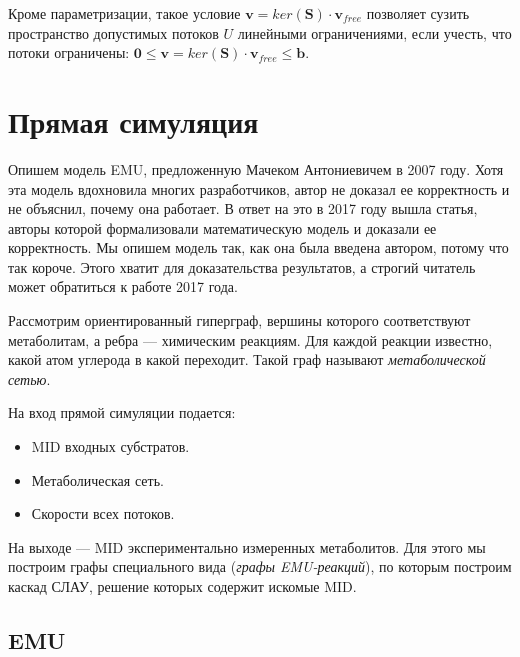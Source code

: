 \documentclass[14pt, a4paper]{extreport}
\begin{document}
Кроме параметризации, такое условие $\mathbf{v} = ker(\mathbf{S}) \cdot \mathbf{v}_{free}$ позволяет сузить пространство допустимых потоков $U$ линейными ограничениями, если учесть, что потоки ограничены: $\mathbf{0} \le \mathbf{v} = ker(\mathbf{S}) \cdot \mathbf{v}_{free} \le \mathbf{b}$.



\clearpage
\section{Прямая симуляция}
Опишем модель EMU, предложенную Мачеком Антониевичем в 2007 году\cite{EMU_2007}. Хотя эта модель вдохновила многих разработчиков, автор не доказал ее корректность и не объяснил, почему она работает. В ответ на это в 2017 году вышла статья\cite{formalizm_2017}, авторы которой формализовали математическую модель и доказали ее корректность. Мы опишем модель так, как она была введена автором, потому что так короче. Этого хватит для доказательства результатов, а строгий читатель может обратиться к работе 2017 года. 

Рассмотрим ориентированный гиперграф, вершины которого соответствуют метаболитам, а ребра --- химическим реакциям. Для каждой реакции известно, какой атом углерода в какой переходит. Такой граф называют \emph{метаболической сетью}.

На вход прямой симуляции подается:
\begin{itemize}
	\item MID входных субстратов.
	\item Метаболическая сеть.
	\item Скорости всех потоков.
\end{itemize}
На выходе --- MID экспериментально измеренных метаболитов.
Для этого мы построим графы специального вида (\emph{графы EMU-реакций}), по которым построим каскад СЛАУ, решение которых содержит искомые MID.

\subsection{EMU}
\end{document}
